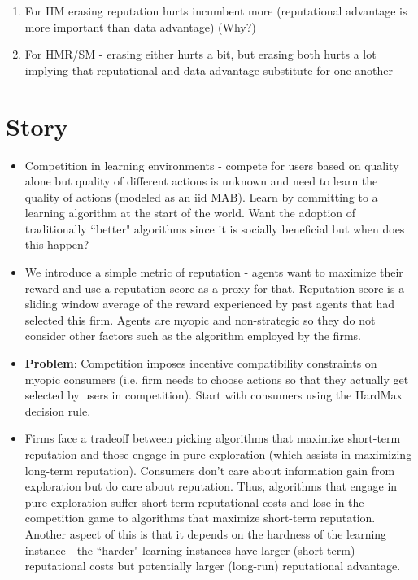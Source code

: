 \documentclass[11pt,letterpaper]{article}
\begin{document}
\begin{enumerate}
\item For HM erasing reputation hurts incumbent more (reputational advantage is more important than data advantage) (Why?)
\item For HMR/SM - erasing either hurts a bit, but erasing both hurts a lot implying that reputational and data advantage substitute for one another
\end{enumerate}

\section*{Story}

\begin{itemize}
\item Competition in learning environments - compete for users based on quality alone but quality of different actions is unknown and need to learn the quality of actions (modeled as an iid MAB). Learn by committing to a learning algorithm at the start of the world. Want the adoption of traditionally ``better" algorithms since it is socially beneficial but when does this happen?
\item We introduce a simple metric of reputation - agents want to maximize their reward and use a reputation score as a proxy for that. Reputation score is a sliding window average of the reward experienced by past agents that had selected this firm. Agents are myopic and non-strategic so they do not consider other factors such as the algorithm employed by the firms.
\item \textbf{Problem}: Competition imposes incentive compatibility constraints on myopic consumers (i.e. firm needs to choose actions so that they actually get selected by users in competition). Start with consumers using the HardMax decision rule.
\item Firms face a tradeoff between picking algorithms that maximize short-term reputation and those engage in pure exploration (which assists in maximizing long-term reputation). Consumers don't care about information gain from exploration but do care about reputation. Thus, algorithms that engage in pure exploration suffer short-term reputational costs and lose in the competition game to algorithms that maximize short-term reputation. Another aspect of this is that it depends on the hardness of the learning instance - the ``harder" learning instances have larger (short-term) reputational costs but potentially larger (long-run) reputational advantage.

\end{itemize}
\end{document}
